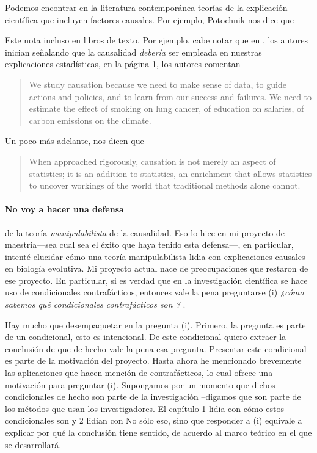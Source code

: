 Podemos encontrar en la literatura contemporánea teorías de la
explicación científica que incluyen factores causales. Por ejemplo,
Potochnik nos dice que 
\parencite[][p.~24] {Potochnik2017-POTIAT-3}

Este  nota incluso en libros de texto. Por
ejemplo, cabe notar que en \cite{Pearl2016}, los autores inician
señalando que la causalidad \emph{debería} ser empleada en nuestras
explicaciones estadísticas, en la página 1, los autores comentan

\begin{quote}
 We study causation because we need to make sense of data, to guide
 actions and policies, and to learn from our success and failures.
 We need to estimate the effect of smoking on lung cancer, of
 education on salaries, of carbon emissions on the climate.
\end{quote}

Un poco más adelante, nos dicen que

\begin{quote}
 When approached rigorously, causation is not merely an aspect of
 statistics; it is an addition to statistics, an enrichment that
 allows statistics to uncover workings of the world that traditional
 methods alone cannot.
\end{quote}

\paragraph{No voy a hacer una defensa} de la teoría \emph{manipulabilista} de la causalidad. Eso lo hice en
mi proyecto de maestría---sea cual sea el éxito que haya tenido esta
defensa---, en particular, intenté elucidar cómo una teoría
manipulabilista lidia con explicaciones causales en biología
evolutiva. Mi proyecto actual nace de preocupaciones que restaron de
ese proyecto. En particular, si es verdad que en la investigación
científica se hace uso de condicionales contrafácticos, entonces vale
la pena preguntarse (i) \emph{¿cómo sabemos qué condicionales
 contrafácticos son ? }.

Hay mucho que desempaquetar en la pregunta (i). Primero, la pregunta
es parte de un condicional, esto es intencional. De este condicional
quiero extraer la conclusión de que de hecho vale la pena esa
pregunta. Presentar este condicional es parte de la motivación del
proyecto. Hasta ahora he mencionado brevemente las aplicaciones que
hacen mención de contrafácticos, lo cual ofrece una motivación para
preguntar (i). Supongamos por un momento que dichos condicionales de
hecho son parte de la investigación --digamos que son parte de los
métodos que usan los investigadores. El capítulo 1 lidia con cómo
estos condicionales son y 2 lidian con No sólo eso, sino que
responder a (i) equivale a explicar por qué la conclusión tiene
sentido, de acuerdo al marco teórico en el que se desarrollará.

